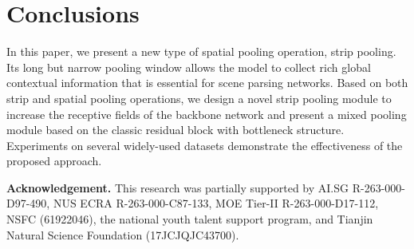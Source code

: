 \documentclass[final]{cvpr}
\newcommand{\myPara}[1]{\vspace{.05in}\noindent\textbf{#1.}}
\begin{document}
\section{Conclusions}

In this paper, we present a new type of spatial pooling operation, 
strip pooling.
Its long but narrow pooling window allows the model to collect rich global contextual information that is essential for scene parsing networks.
Based on both strip and spatial pooling operations, 
we design a novel strip pooling module to increase the receptive fields
of the backbone network and present a mixed pooling module based on 
the classic residual block with bottleneck structure.
Experiments on several widely-used datasets demonstrate the effectiveness
of the proposed approach.


\myPara{Acknowledgement}
This research was partially supported by AI.SG R-263-000-D97-490, 
NUS ECRA R-263-000-C87-133, MOE Tier-II R-263-000-D17-112,
NSFC (61922046), the national youth talent support program, 
and Tianjin Natural Science Foundation (17JCJQJC43700).


{\small


}
\end{document}
